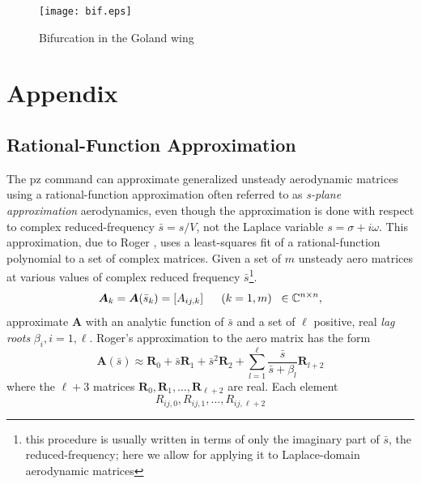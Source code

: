 \documentclass[11pt,openany,twoside]{book}
\numberwithin{equation}{section}		%
\newcommand{\Cmd}[1]{{\sf #1}}
\newcommand{\Newterm}[1]{{\em #1}}	%
\newcommand{\Matrix}[1]{\boldsymbol{#1}}
\begin{document}
\begin{figure}[h!]
		\texttt{[image: bif.eps]}
	\centering
	\caption{Bifurcation in the Goland wing}\label{fig:bifurcation}
\end{figure}

\newpage
\chapter{Appendix}\label{chap:appendices}

\section{Rational-Function Approximation}\label{sect:rfa-theory}
\par
{}
The \Cmd{pz} command can approximate generalized
unsteady aerodynamic matrices using a rational-function
approximation often referred to as \Newterm{s-plane approximation}
aerodynamics, even though the approximation is done
with respect to complex reduced-frequency $\bar{s} = s/V$,
not the Laplace variable $s = \sigma + i\omega$.
This approximation, due to Roger \cite{roger1977airplane},
uses a least-squares fit of a rational-function polynomial
to a set of complex matrices. Given a set of $m$
unsteady aero matrices at various values of complex
reduced frequency $\bar{s}$\footnote{this procedure is usually written
in terms of only the imaginary part of $\bar{s}$, the reduced-frequency; here
we allow for applying it to Laplace-domain aerodynamic matrices}.
\begin{equation}
\Matrix{A}_k = \Matrix{A}(\bar{s}_k) = \left[A_{ij,k}\right]
			\hspace{5mm} (k = 1, m) \; \; \in \mathbb{C}^{n \times n},
\end{equation}
approximate $\Matrix{A}$ with an analytic function of $\bar{s}$ and a set of
$\ell$ positive, real \emph{lag roots} $\beta_i, i=1,\ell$.
Roger's approximation to the aero matrix has the form
\begin{equation}
  \Matrix{A}(\bar{s}) \approx \Matrix{R}_0 + \bar{s}\Matrix{R}_1 + \bar{s}^2 \Matrix{R}_2 +  \sum_{l=1}^{\ell} \frac{\bar{s}}{\bar{s} + \beta_l} \Matrix{R}_{l+2}
\end{equation}
where the $\ell + 3$ matrices
$\Matrix{R}_0, \Matrix{R}_1, \ldots, \Matrix{R}_{\ell+2}$ are real.
Each element
\begin{displaymath}
R_{ij,0}, R_{ij,1}, \ldots, R_{ij,\ell+2}
\end{displaymath}
\end{document}
